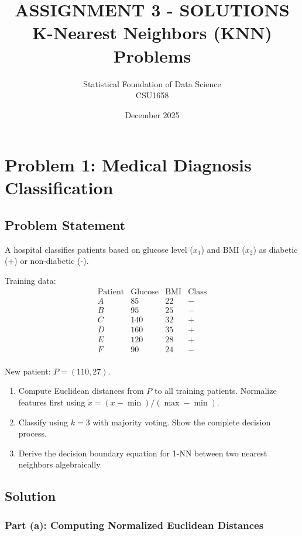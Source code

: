 \documentclass[12pt]{article}
\title{ASSIGNMENT 3 - SOLUTIONS\\
\large K-Nearest Neighbors (KNN) Problems}
\author{Statistical Foundation of Data Science\\
CSU1658}
\date{December 2025}
\begin{document}
\maketitle

\tableofcontents
\newpage

\section{Problem 1: Medical Diagnosis Classification}

\subsection{Problem Statement}

A hospital classifies patients based on glucose level (\(x_1\)) and BMI (\(x_2\)) as diabetic (+) or non-diabetic (-).

Training data:
\[\begin{array}{c|cc|c}
\text{Patient} & \text{Glucose} & \text{BMI} & \text{Class} \\
\hline
A & 85 & 22 & - \\
B & 95 & 25 & - \\
C & 140 & 32 & + \\
D & 160 & 35 & + \\
E & 120 & 28 & + \\
F & 90 & 24 & - \\
\end{array}\]

New patient: \(P = (110, 27)\).

\begin{enumerate}
\item[(a)] Compute Euclidean distances from \(P\) to all training patients. Normalize features first using \(\tilde{x} = (x - \min)/(\max - \min)\).
\item[(b)] Classify using \(k=3\) with majority voting. Show the complete decision process.
\item[(c)] Derive the decision boundary equation for 1-NN between two nearest neighbors algebraically.
\end{enumerate}

\subsection{Solution}

\subsubsection{Part (a): Computing Normalized Euclidean Distances}
\end{document}
